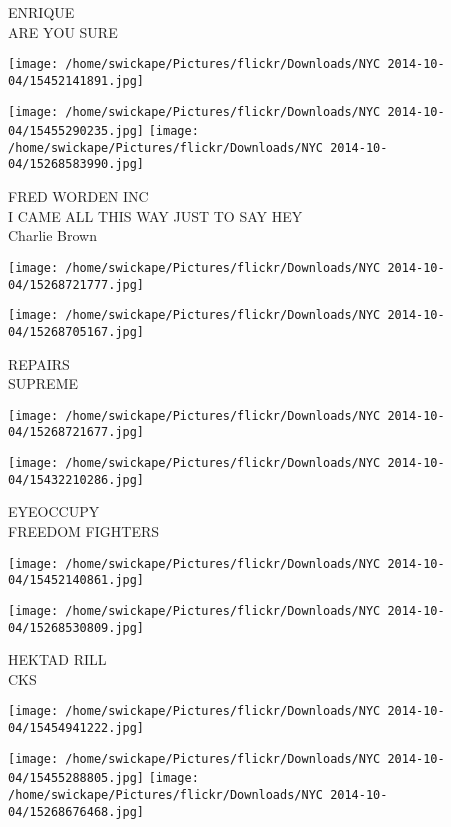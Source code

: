 \documentclass[10pt,letterpaper]{article}
\begin{document}
ENRIQUE\\
ARE YOU SURE
\pagebreak

\texttt{[image: /home/swickape/Pictures/flickr/Downloads/NYC 2014-10-04/15452141891.jpg]}

\vspace{0.25in}
\texttt{[image: /home/swickape/Pictures/flickr/Downloads/NYC 2014-10-04/15455290235.jpg]}
\texttt{[image: /home/swickape/Pictures/flickr/Downloads/NYC 2014-10-04/15268583990.jpg]}

FRED WORDEN INC\\
I CAME ALL THIS WAY JUST TO SAY HEY\\
Charlie Brown
\pagebreak

\texttt{[image: /home/swickape/Pictures/flickr/Downloads/NYC 2014-10-04/15268721777.jpg]}

\vspace{0.25in}
\texttt{[image: /home/swickape/Pictures/flickr/Downloads/NYC 2014-10-04/15268705167.jpg]}

REPAIRS\\
SUPREME
\pagebreak

\texttt{[image: /home/swickape/Pictures/flickr/Downloads/NYC 2014-10-04/15268721677.jpg]}

\vspace{0.25in}
\texttt{[image: /home/swickape/Pictures/flickr/Downloads/NYC 2014-10-04/15432210286.jpg]}

EYEOCCUPY\\
FREEDOM FIGHTERS
\pagebreak

\texttt{[image: /home/swickape/Pictures/flickr/Downloads/NYC 2014-10-04/15452140861.jpg]}

\vspace{0.25in}
\texttt{[image: /home/swickape/Pictures/flickr/Downloads/NYC 2014-10-04/15268530809.jpg]}

HEKTAD RILL\\
CKS
\pagebreak

\texttt{[image: /home/swickape/Pictures/flickr/Downloads/NYC 2014-10-04/15454941222.jpg]}

\vspace{0.25in}
\texttt{[image: /home/swickape/Pictures/flickr/Downloads/NYC 2014-10-04/15455288805.jpg]}
\texttt{[image: /home/swickape/Pictures/flickr/Downloads/NYC 2014-10-04/15268676468.jpg]}
\end{document}
